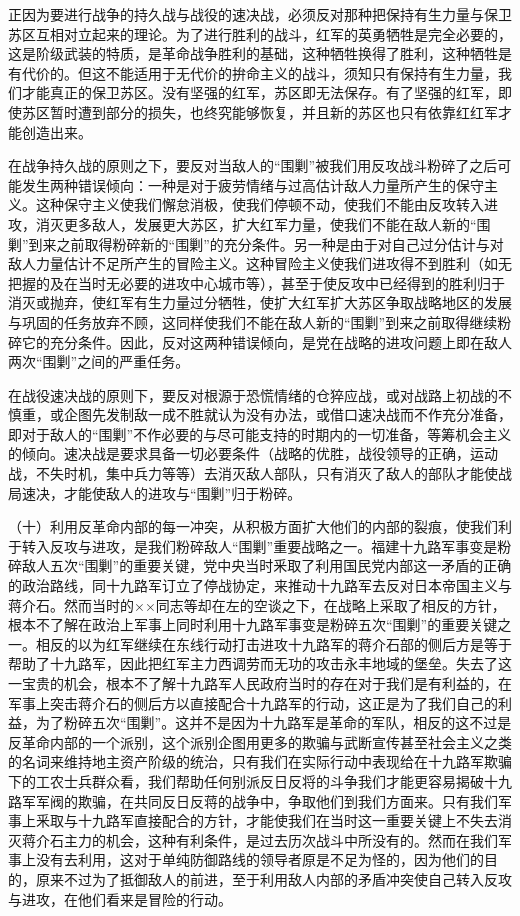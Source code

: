 正因为要进行战争的持久战与战役的速决战，必须反对那种把保持有生力量与保卫苏区互相对立起来的理论。为了进行胜利的战斗，红军的英勇牺牲是完全必要的，这是阶级武装的特质，是革命战争胜利的基础，这种牺牲换得了胜利，这种牺牲是有代价的。但这不能适用于无代价的拚命主义的战斗，须知只有保持有生力量，我们才能真正的保卫苏区。没有坚强的红军，苏区即无法保存。有了坚强的红军，即使苏区暂时遭到部分的损失，也终究能够恢复，并且新的苏区也只有依靠红红军才能创造出来。

在战争持久战的原则之下，要反对当敌人的“围剿”被我们用反攻战斗粉碎了之后可能发生两种错误倾向：一种是对于疲劳情绪与过高估计敌人力量所产生的保守主义。这种保守主义使我们懈怠消极，使我们停顿不动，使我们不能由反攻转入进攻，消灭更多敌人，发展更大苏区，扩大红军力量，使我们不能在敌人新的“围剿”到来之前取得粉碎新的“围剿”的充分条件。另一种是由于对自己过分估计与对敌人力量估计不足所产生的冒险主义。这种冒险主义使我们进攻得不到胜利（如无把握的及在当时无必要的进攻中心城市等），甚至于使反攻中已经得到的胜利归于消灭或抛弃，使红军有生力量过分牺牲，使扩大红军扩大苏区争取战略地区的发展与巩固的任务放弃不顾，这同样使我们不能在敌人新的“围剿”到来之前取得继续粉碎它的充分条件。因此，反对这两种错误倾向，是党在战略的进攻问题上即在敌人两次“围剿”之间的严重任务。

在战役速决战的原则下，要反对根源于恐慌情绪的仓猝应战，或对战路上初战的不慎重，或企图先发制敌一成不胜就认为没有办法，或借口速决战而不作充分准备，即对于敌人的“围剿”不作必要的与尽可能支持的时期内的一切准备，等筹机会主义的倾向。速决战是要求具备一切必要条件（战略的优胜，战役领导的正确，运动战，不失时机，集中兵力等等）去消灭敌人部队，只有消灭了敌人的部队才能使战局速决，才能使敌人的进攻与“围剿”归于粉碎。

（十）利用反革命内部的每一冲突，从积极方面扩大他们的内部的裂痕，使我们利于转入反攻与进攻，是我们粉碎敌人“围剿”重要战略之一。福建十九路军事变是粉碎敌人五次“围剿”的重要关键，党中央当时釆取了利用国民党内部这一矛盾的正确的政治路线，同十九路军订立了停战协定，来推动十九路军去反对日本帝国主义与蒋介石。然而当时的××同志等却在左的空谈之下，在战略上采取了相反的方针，根本不了解在政治上军事上同时利用十九路军事变是粉碎五次“围剿”的重要关键之一。相反的以为红军继续在东线行动打击进攻十九路军的蒋介石部的侧后方是等于帮助了十九路军，因此把红军主力西调劳而无功的攻击永丰地域的堡垒。失去了这一宝贵的机会，根本不了解十九路军人民政府当时的存在对于我们是有利益的，在军事上突击蒋介石的侧后方以直接配合十九路军的行动，这正是为了我们自己的利益，为了粉碎五次“围剿”。这并不是因为十九路军是革命的军队，相反的这不过是反革命内部的一个派别，这个派别企图用更多的欺骗与武断宣传甚至社会主义之类的名词来维持地主资产阶级的统治，只有我们在实际行动中表现给在十九路军欺骗下的工农士兵群众看，我们帮助任何别派反日反将的斗争我们才能更容易揭破十九路军军阀的欺骗，在共同反日反蒋的战争中，争取他们到我们方面来。只有我们军事上釆取与十九路军直接配合的方针，才能使我们在当时这一重要关键上不失去消灭蒋介石主力的机会，这种有利条件，是过去历次战斗中所没有的。然而在我们军事上没有去利用，这对于单纯防御路线的领导者原是不足为怪的，因为他们的目的，原来不过为了抵御敌人的前进，至于利用敌人内部的矛盾冲突使自己转入反攻与进攻，在他们看来是冒险的行动。

